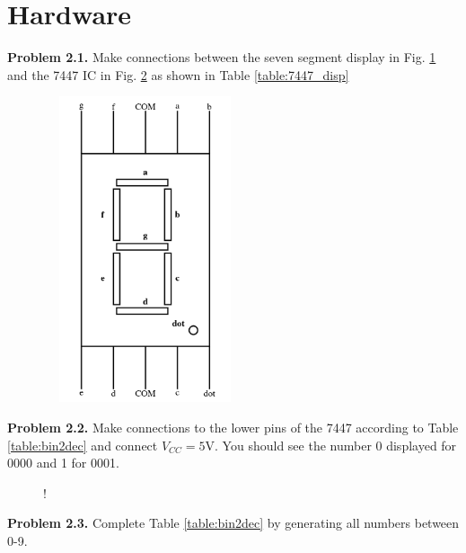 \documentclass[journal,12pt,twocolumn]{IEEEtran}
\begin{document}
\section{Hardware}
\textbf{Problem 2.1.} Make connections between the seven segment display in Fig. \ref{fig:sevenseg} and the  7447 IC in Fig. \ref{fig:7447} as shown in Table \ref{table:7447_disp} \\
%
\begin{table}[!h]
\centering

\caption{}
\label{table:7447_disp}
\end{table}
\begin{figure}[!h]
\begin{center}
	\includegraphics[width=6cm,height=9cm]{./sevenseg}
\end{center}
\caption{}
\label{fig:sevenseg}
\end{figure}
\textbf{Problem 2.2.} Make connections to the lower pins of the 7447 according to
Table \ref{table:bin2dec} and connect $V_{CC} = 5$V. You should see the number 0 displayed for 0000 and 1 for 0001.\\
%
\begin{table}[!h]
\centering

\caption{}
\label{table:bin2dec}
\end{table}
%
\begin{figure}[!h]
\begin{center}
	\resizebox {\columnwidth} {!} {
		
	}
\end{center}
\caption{}
\label{fig:7447}
\end{figure}
%
\textbf{Problem 2.3.} Complete Table \ref{table:bin2dec} by generating all numbers between 0-9.
\end{document}
